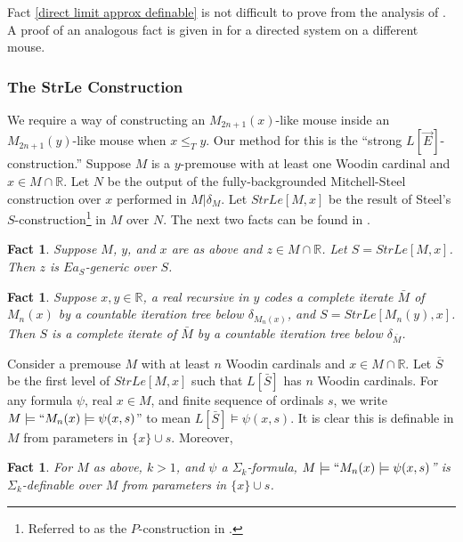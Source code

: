 \documentclass[12pt]{article}
\newtheorem{fact}[theorem]{Fact}
\newcommand\R{\mathbb{R}}
\begin{document}
{Fact \ref{direct limit approx definable} is not difficult to prove from the analysis of \cite{on_the_pwo}. A proof of an analogous fact is given in \cite{phdthesis} for a directed system on a different mouse.

\subsubsection*{The StrLe Construction}

We require a way of constructing an $M_{2n+1}(x)$-like mouse inside an $M_{2n+1}(y)$-like mouse when $x\leq_T y$. Our method for this is the ``strong $L[\vec{E}]$-construction.'' Suppose $M$ is a $y$-premouse with at least one Woodin cardinal and $x\in M\cap \R$. Let $N$ be the output of the fully-backgrounded Mitchell-Steel construction over $x$ performed in $M|\delta_M$. Let $StrLe[M,x]$ be the result of Steel's $S$-construction\footnote{Referred to as the $P$-construction in \cite{self-iter}.} in $M$ over $N$. The next two facts can be found in \cite{hra}.

\begin{fact}
\label{generic for strle}
    Suppose $M$, $y$, and $x$ are as above and $z\in M\cap\R$. Let $S = StrLe[M,x]$. Then $z$ is $Ea_S$-generic over $S$.
\end{fact}

\begin{fact}
\label{strle in directed system}
    Suppose $x,y\in\R$, a real recursive in $y$ codes a complete iterate $\bar{M}$ of $M_n(x)$ by a countable iteration tree below $\delta_{M_n(x)}$, and $S = StrLe[M_n(y),x]$. Then $S$ is a complete iterate of $\bar{M}$ by a countable iteration tree below $\delta_{\bar{M}}$.
\end{fact}

Consider a premouse $M$ with at least $n$ Woodin cardinals and $x\in M \cap \R$. Let $\bar{S}$ be the first level of $StrLe[M,x]$ such that $L[\bar{S}]$ has $n$ Woodin cardinals. For any formula $\psi$, real $x\in M$, and finite sequence of ordinals $s$,  we write $M\models ``M_n(x) \models \psi(x,s)$'' to mean $L[\bar{S}]\models \psi(x,s)$. It is clear this is definable in $M$ from parameters in $\{x\}\cup s$. Moreover,

\begin{fact}
\label{strle formula definable}
    For $M$ as above, $k > 1$, and $\psi$ a $\Sigma_k$-formula, $M\models ``M_n(x) \models \psi(x,s)$'' is $\Sigma_k$-definable over $M$ from parameters in $\{x\}\cup s$.
\end{fact}

}
\end{document}
